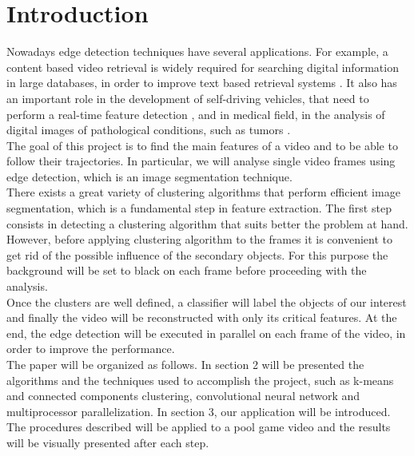 \documentclass{usiinftr}
\begin{document}
\section{Introduction}
Nowadays edge detection techniques have several applications. For example, a content based video retrieval is widely required for searching digital information in large databases, in order to improve text based retrieval systems \cite{1}. It also has an important role in the development of self-driving vehicles, that need to perform a real-time feature detection \cite{2}, and in medical field, in the analysis of digital images of pathological conditions, such as tumors \cite{3}. \\
The goal of this project is to find the main features of a video and to be able to follow their trajectories. In particular, we will analyse single video frames using edge detection, which is an image segmentation technique. \\
There exists a great variety of clustering algorithms that perform efficient image segmentation, which is a fundamental step in feature extraction. The first step consists in detecting a clustering algorithm that suits better the problem at hand. 
However, before applying clustering algorithm to the frames it is convenient to get rid of the possible influence of the secondary objects. For this purpose the background will be set to black on each frame before proceeding with the analysis. \\
Once the clusters are well defined, a classifier will label the objects of our interest and finally the video will be reconstructed with only its critical features. At the end, the edge detection will be executed in parallel on each frame of the video, in order to improve the performance. \\
The paper will be organized as follows. In section 2 will be presented the algorithms and the techniques used to accomplish the project, such as k-means and connected components clustering, convolutional neural network and multiprocessor parallelization. In section 3, our application will be introduced. The procedures described will be applied to a pool game video and the results will be visually presented  after each step. 
\end{document}
